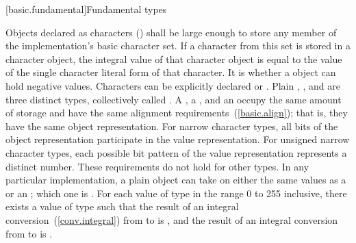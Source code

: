 [basic.fundamental]{Fundamental types}

\pnum
{}%
%
%
%
%
%
%
%
Objects declared as characters () shall be large enough to
store any member of the implementation's basic character set. If a
character from this set is stored in a character object, the integral
value of that character object is equal to the value of the single
character literal form of that character. It is 
whether a  object can hold negative values.
%
%
%
Characters can be explicitly declared  or
.
%
Plain , , and  are
three distinct types, collectively called .
A , a , and an
 occupy the same amount of storage and have the
same alignment requirements~(\ref{basic.align}); that is, they have the
same object representation. For narrow character types, all bits of the object
representation participate in the value representation. For unsigned narrow
character types, each possible bit pattern of the value representation
represents a distinct number. These requirements do not hold for other types. In
any particular implementation, a plain  object can take on
either the same values as a  or an ; which one is .
For each value  of type  in the range
0 to 255 inclusive, there exists a value  of type
 such that the result of an integral
conversion~(\ref{conv.integral}) from  to  is
, and the result of an integral conversion from
 to  is .

